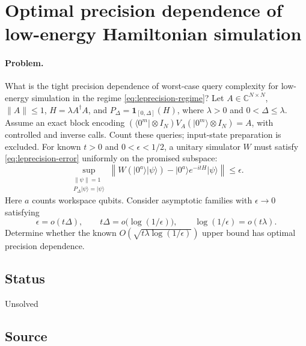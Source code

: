 \section{Optimal precision dependence of low-energy Hamiltonian simulation}
\label{sec:op_25d9dee5435ea835}

\paragraph{Problem.}
What is the tight precision dependence of worst-case query complexity for low-energy simulation in the regime \eqref{eq:leprecision-regime}?
Let $A\in\mathbb{C}^{N\times N}$, $\lVert A\rVert\leq1$, $H=\lambda A^\dagger A$, and $P_\Delta=\mathbf{1}_{[0,\Delta]}(H)$, where $\lambda>0$ and $0<\Delta\leq\lambda$. Assume an exact block encoding $(\langle0^m\rvert\otimes I_N)V_A(\lvert0^m\rangle\otimes I_N)=A$, with controlled and inverse calls. Count these queries; input-state preparation is excluded.
For known $t>0$ and $0<\epsilon<1/2$, a unitary simulator $W$ must satisfy \eqref{eq:leprecision-error} uniformly on the promised subspace:
\begin{equation}
 \sup_{\substack{\lVert\psi\rVert=1\\P_\Delta\lvert\psi\rangle=\lvert\psi\rangle}}
 \left\lVert W(\lvert0^a\rangle\lvert\psi\rangle)
 -\lvert0^a\rangle e^{-itH}\lvert\psi\rangle\right\rVert\leq\epsilon.
 \label{eq:leprecision-error}
\end{equation}
Here $a$ counts workspace qubits. Consider asymptotic families with $\epsilon\to0$ satisfying
\begin{equation}
 \epsilon=o(t\Delta),\qquad
 t\Delta=o\bigl(\log(1/\epsilon)\bigr),\qquad
 \log(1/\epsilon)=o(t\lambda).
 \label{eq:leprecision-regime}
\end{equation}
Determine whether the known $O(\sqrt{t\lambda\log(1/\epsilon)})$ upper bound has optimal precision dependence.

\subsection*{Status}

Unsolved

\subsection*{Source}

